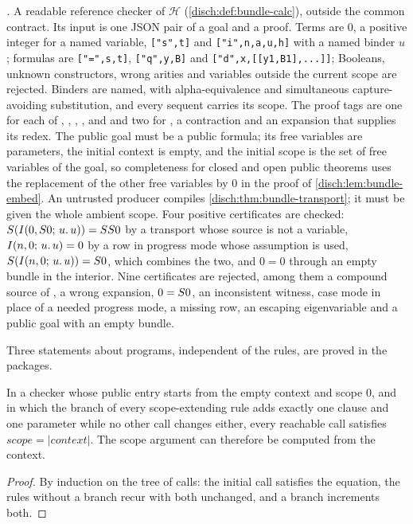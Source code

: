 \emph{.} A readable reference checker of
$\mathcal H$ (\cref{disch:def:bundle-calc}), outside the common contract.
Its input is one JSON pair of a goal and a proof. Terms are $0$, a positive
integer for a named variable, \texttt{["s",t]} and
\texttt{["i",n,a,u,h]} with a named binder $u$; formulas are
\texttt{["=",s,t]}, \texttt{["q",y,B]} and \texttt{["d",x,[[y1,B1],...]]};
Booleans, unknown constructors, wrong arities and variables outside the
current scope are rejected. Binders are named, with alpha-equivalence and
simultaneous capture-avoiding substitution, and every sequent carries its
scope. The proof tags are one for each of , ,
, ,  and  and two for
, a contraction and an expansion that supplies its redex. The
public goal must be a public formula; its free variables are parameters, the
initial context is empty, and the initial scope is the set of free variables
of the goal, so completeness for closed and open public theorems uses the
replacement of the other free variables by $0$ in the proof of
\cref{disch:lem:bundle-embed}. An untrusted producer compiles
\cref{disch:thm:bundle-transport}; it must be given the whole ambient scope.
Four positive certificates are checked: $S(I(0,S 0;\,u.\,u))=SS 0$
by a transport whose source is not a variable, $I(n,0;\,u.\,u)=0$ by a row
in progress mode whose assumption is used, $S(I(n,0;\,u.\,u))=S 0$,
which combines the two, and $0=0$ through an empty bundle in the interior.
Nine certificates are rejected, among them a compound source of
, a wrong expansion, $0=S 0$, an inconsistent witness, case
mode in place of a needed progress mode, a missing row, an escaping
eigenvariable and a public goal with an empty bundle.

Three statements about programs, independent of the rules, are proved in
the packages.

\begin{proposition}
\label{disch:prop:scope}
In a checker whose public entry starts from the empty context and scope
$0$, and in which the branch of every scope-extending rule adds exactly
one clause and one parameter while no other call changes either, every
reachable call satisfies $\mathit{scope}=|\mathit{context}|$. The scope
argument can therefore be computed from the context.
\end{proposition}

\begin{proof}
By induction on the tree of calls: the initial call satisfies the
equation, the rules without a branch recur with both unchanged, and a
branch increments both.
\end{proof}

